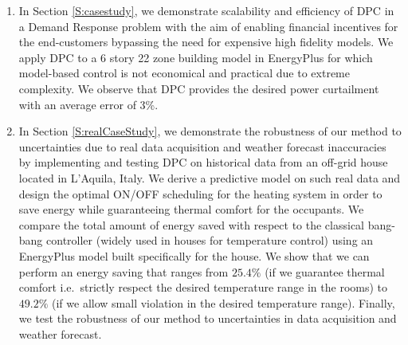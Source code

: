 {\begin{enumerate}
	\item In Section \ref{S:casestudy}, we demonstrate scalability and efficiency of DPC in a Demand Response problem with the aim of enabling financial incentives for the end-customers bypassing the need for expensive high fidelity models. We apply DPC to a 6 story 22 zone building model in EnergyPlus for which model-based control is not economical and practical due to extreme complexity. We observe that DPC provides the desired power curtailment with an average error of 3\%.
	\item In Section \ref{S:realCaseStudy}, we demonstrate the robustness of our method to uncertainties due to real data acquisition and weather forecast inaccuracies by implementing and testing DPC on historical data from an off-grid house located in L'Aquila, Italy. We derive a predictive model on such real data and design the optimal ON/OFF scheduling for the heating system in order to save energy while guaranteeing thermal comfort for the occupants. We compare the total amount of energy saved with respect to the classical bang-bang controller (widely used in houses for temperature control) using an EnergyPlus model built specifically for the house. We show that we can perform an energy saving that ranges from $25.4\%$ (if we guarantee thermal comfort i.e.~strictly respect the desired temperature range in the rooms) to $49.2\%$ (if we allow small violation in the desired temperature range). Finally, we test the robustness of our method to uncertainties in data acquisition and weather forecast.
\end{enumerate}
}


